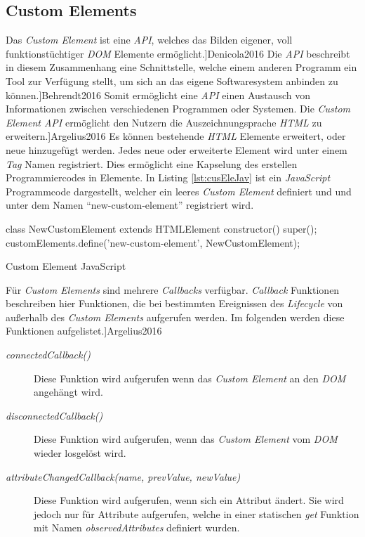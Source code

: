 \documentclass[12pt, paper=a4, bibtotoc, toc=listof, headsepline=true]{scrreprt}
\renewcommand{\smfootcite}[2][2]{\relax}
\begin{document}
			\subsection{Custom Elements}
			Das \emph{Custom Element} ist eine \emph{\ac{API}}, welches das Bilden eigener, voll funktionstüchtiger \emph{\ac{DOM}} Elemente ermöglicht.\smfootcite[ vgl. ][]{Denicola2016} Die \emph{\ac{API}} beschreibt in diesem Zusammenhang eine Schnittstelle, welche einem anderen Programm ein Tool zur Verfügung stellt, um sich an das eigene Softwaresystem anbinden zu können.\smfootcite[ vgl.][]{Behrendt2016} Somit ermöglicht eine \emph{\ac{API}} einen Austausch von Informationen zwischen verschiedenen Programmen oder Systemen.	
			Die \emph{Custom Element \ac{API}} ermöglicht den Nutzern die Auszeichnungsprache \emph{\ac{HTML}} zu erweitern.\smfootcite[ vgl.][]{Argelius2016} Es können bestehende \emph{\ac{HTML}} Elemente erweitert, oder neue hinzugefügt werden. Jedes neue oder erweiterte Element wird unter einem \emph{Tag} Namen registriert. Dies ermöglicht eine Kapselung des erstellen Programmiercodes in Elemente. In Listing \ref{lst:cusEleJav} ist ein \emph{JavaScript} Programmcode dargestellt, welcher ein leeres \emph{Custom Element} definiert und und unter dem Namen \enquote{new-custom-element} registriert wird.
			\begin{listing}
				\begin{JavaScriptcode*}{}
class NewCustomElement extends HTMLElement {
	constructor() {
		super();
	}
}
customElements.define('new-custom-element', NewCustomElement);
				\end{JavaScriptcode*}
				\caption{Custom Element JavaScript}
				\label{lst:cusEleJav}
			\end{listing}
			Für \emph{Custom Elements} sind mehrere \emph{Callbacks} verfügbar. \emph{Callback} Funktionen beschreiben hier Funktionen, die bei bestimmten Ereignissen des \emph{Lifecycle} von außerhalb des \emph{Custom Elements} aufgerufen werden. Im folgenden werden diese Funktionen aufgelistet.\smfootcite[ vgl.][]{Argelius2016}
			\begin{description}  
				\item  [\emph{connectedCallback()}] Diese Funktion wird aufgerufen wenn das \emph{Custom Element} an den \emph{\ac{DOM}} angehängt wird.
				\item [\emph{disconnectedCallback()}] Diese Funktion wird aufgerufen, wenn das \emph{Custom Element} vom \emph{\ac{DOM}} wieder losgelöst wird. 
				\item  [\emph{attributeChangedCallback(name, prevValue, newValue)}] Diese Funktion wird aufgerufen, wenn sich ein Attribut ändert. Sie wird jedoch nur für Attribute aufgerufen, welche in einer statischen \emph{get} Funktion mit Namen \emph{observedAttributes} definiert wurden.
			\end{description}
\end{document}
